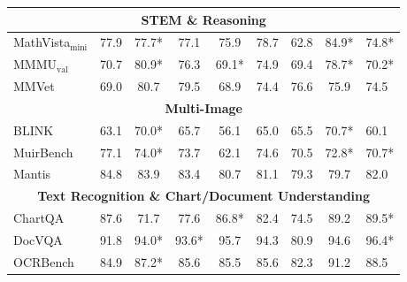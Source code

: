 \documentclass{article}
\begin{document}
\begin{table}[htbp]
{\begin{tabular}{l|cccccc|cl}
            \midrule
            \multicolumn{9}{c}{\textbf{STEM \& Reasoning}} \\
            \midrule
            MathVista$_{\text{mini}}$  & 77.9 & 77.7* & 77.1 & 75.9  & 78.7 & 62.8  &84.9* & 74.8* \\
            MMMU$_{\text{val}}$        & 70.7 & 80.9* & 76.3 & 69.1* & 74.9 & 69.4 &78.7* & 70.2* \\  
            MMVet                      & 69.0 & 80.7 & 79.5 & 68.9 & 74.4 & 76.6 &75.9 & 74.5 \\
            \midrule
            \multicolumn{9}{c}{\textbf{Multi-Image}} \\
            \midrule
            BLINK                      & 63.1 & 70.0* & 65.7 & 56.1 & 65.0 & 65.5 &70.7* & 60.1 \\
            MuirBench                  & 77.1 & 74.0* & 73.7 & 62.1 & 74.6 & 70.5 &72.8* & 70.7* \\  
            Mantis                     & 84.8 & 83.9  & 83.4 & 80.7 & 81.1 & 79.3 &79.7 & 82.0 \\
            \midrule
            \multicolumn{9}{c}{\textbf{Text Recognition \& Chart/Document Understanding}} \\
            \midrule
            ChartQA               & 87.6 & 71.7 & 77.6 & 86.8*  & 82.4 & 74.5  & 89.2 & 89.5* \\
            DocVQA                & 91.8 & 94.0* & 93.6*  & 95.7   & 94.3 & 80.9  & 94.6 & 96.4* \\
            OCRBench              & 84.9 & 87.2*  & 85.6 & 85.5   & 85.6 & 82.3  & 91.2 & 88.5 \\

\end{tabular}}
\end{table}
\end{document}
